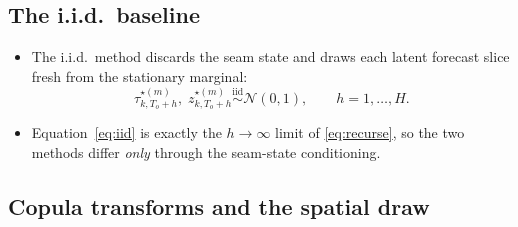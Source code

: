 \documentclass[11pt]{article}
\newcommand{\Norm}{\mathcal{N}}
\begin{document}
\subsection{The i.i.d.\ baseline}

\begin{itemize}[leftmargin=1.4em]
  \item The i.i.d.\ method discards the seam state and draws each
        latent forecast slice fresh from the stationary marginal:
        \begin{equation}
          \tau^{\star(m)}_{k,T_o+h},\;
          z^{\star(m)}_{k,T_o+h}
          \overset{\text{iid}}{\sim} \Norm(0,1),
          \qquad h = 1,\dots,H .
          \label{eq:iid}
        \end{equation}
  \item Equation~\eqref{eq:iid} is exactly the $h\to\infty$ limit of
        \eqref{eq:recurse}, so the two methods differ \emph{only}
        through the seam-state conditioning.
\end{itemize}

\subsection{Copula transforms and the spatial draw}
\end{document}
